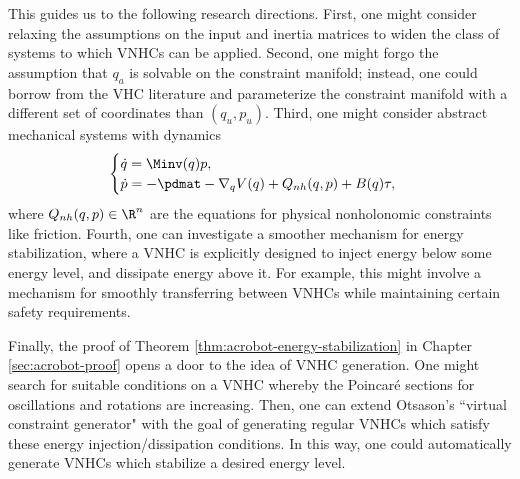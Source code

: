 This guides us to the following research directions. 
First, one might consider relaxing the assumptions on the input and inertia
matrices to widen the class of systems to which VNHCs can be applied.
Second, one might forgo the assumption that \(q_a\) is solvable on the
constraint manifold; instead, one could borrow from the VHC literature
and parameterize the constraint manifold with a different set of
coordinates than \((q_u,p_u)\).
Third, one might consider abstract mechanical systems with dynamics
\[
    \begin{cases}
        \dot{q} = \Minv(q) p
        , \\
        \dot{p} = -\pdmat - \nabla_q V(q) + Q_{nh}(q,p) + B(q)\tau
        ,
    \end{cases}
\]
where \(Q_{nh}(q,p) \in \R^n\) are the equations for physical nonholonomic
constraints like friction.
Fourth, one can investigate a smoother mechanism for energy stabilization, where
a VNHC is explicitly designed to inject energy below some energy level, and
dissipate energy above it.
For example, this might involve a mechanism for smoothly transferring between 
VNHCs while maintaining certain safety requirements.

Finally, the proof of Theorem \ref{thm:acrobot-energy-stabilization} 
in Chapter \ref{sec:acrobot-proof} opens a door to the idea of VNHC generation. 
One might search for suitable conditions on a VNHC whereby the Poincar\'{e}
sections for oscillations and rotations are increasing.
Then, one can extend Otsason's ``virtual constraint
generator" \cite{vcg} with the goal of generating regular VNHCs which satisfy
these energy injection/dissipation conditions.
In this way, one could automatically generate VNHCs which stabilize a
desired energy level.

